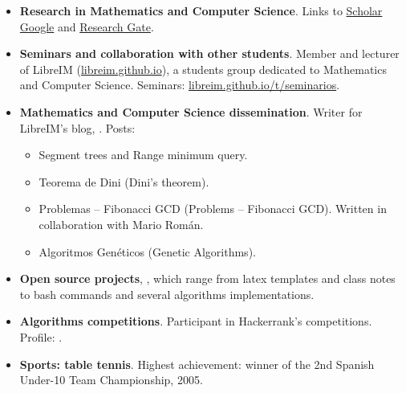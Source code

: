 \documentclass[10pt,a4paper,sans]{moderncv} %
\begin{document}
\begin{itemize}
    \item \textbf{Research in Mathematics and Computer Science}. Links to \textcolor{colorl}{\href{https://scholar.google.es/citations?user=oLAt2JsAAAAJ&hl=es}{Scholar Google}} and \textcolor{colorl}{\href{https://www.researchgate.net/profile/Andres_Herrera-Poyatos}{Research Gate}}.
    \item \textbf{Seminars and collaboration with other students}. Member and lecturer of LibreIM (\textcolor{colorl}{\url{libreim.github.io}}), a students group dedicated to Mathematics and Computer Science.
      Seminars: \textcolor{colorl}{\url{libreim.github.io/t/seminarios}}.
    \item \textbf{Mathematics and Computer Science dissemination}. Writer for LibreIM's blog, \textcolor{colorl}{}. Posts:
    	\begin{itemize}
    		\item Segment trees and Range minimum query.
    		\item Teorema de Dini (Dini's theorem).
    		\item Problemas -- Fibonacci GCD (Problems -- Fibonacci GCD). Written in collaboration with Mario Román.
    		\item Algoritmos Genéticos (Genetic Algorithms).
    	\end{itemize}
    \item \textbf{Open source projects}, \textcolor{colorl}{}, which range from latex templates and class notes to bash commands and several algorithms implementations.
    \item \textbf{Algorithms competitions}. Participant in Hackerrank's competitions. Profile: \textcolor{colorl}{}.
    \item \textbf{Sports: table tennis}. Highest achievement: winner of the 2nd Spanish Under-10 Team Championship, 2005.
\end{itemize}

\end{document}
